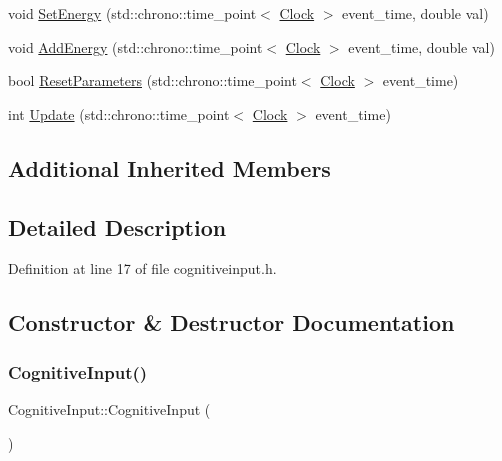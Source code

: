 \begin{DoxyCompactItemize}
\item 
void \hyperlink{class_cognitive_input_a3498a8b5333606ef4d089e6c427ddf74}{Set\+Energy} (std\+::chrono\+::time\+\_\+point$<$ \hyperlink{universe_8h_a0ef8d951d1ca5ab3cfaf7ab4c7a6fd80}{Clock} $>$ event\+\_\+time, double val)
\item 
void \hyperlink{class_cognitive_input_a23f56d012233f655e1530ab61d80c27f}{Add\+Energy} (std\+::chrono\+::time\+\_\+point$<$ \hyperlink{universe_8h_a0ef8d951d1ca5ab3cfaf7ab4c7a6fd80}{Clock} $>$ event\+\_\+time, double val)
\item 
bool \hyperlink{class_cognitive_input_a943605b820cc279533e19d24e11405c6}{Reset\+Parameters} (std\+::chrono\+::time\+\_\+point$<$ \hyperlink{universe_8h_a0ef8d951d1ca5ab3cfaf7ab4c7a6fd80}{Clock} $>$ event\+\_\+time)
\item 
int \hyperlink{class_cognitive_input_a93bd9d88194a545c9a85512edcbb6044}{Update} (std\+::chrono\+::time\+\_\+point$<$ \hyperlink{universe_8h_a0ef8d951d1ca5ab3cfaf7ab4c7a6fd80}{Clock} $>$ event\+\_\+time)
\end{DoxyCompactItemize}
\subsection*{Additional Inherited Members}


\subsection{Detailed Description}


Definition at line 17 of file cognitiveinput.\+h.



\subsection{Constructor \& Destructor Documentation}
\mbox{\label{class_cognitive_input_a5c3c102dc3ec6cfec25eb849488e9782}} 
\subsubsection{\texorpdfstring{Cognitive\+Input()}{CognitiveInput()}\hspace{0.1cm}{\footnotesize\ttfamily [1/4]}}
{\footnotesize\ttfamily Cognitive\+Input\+::\+Cognitive\+Input (\begin{DoxyParamCaption}{ }\end{DoxyParamCaption})\hspace{0.3cm}{\ttfamily [inline]}}



